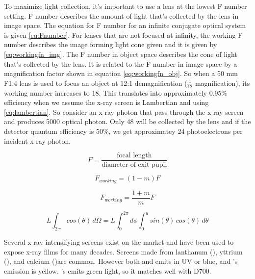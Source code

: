 To maximize light collection, it's important to use a lens at the lowest F number setting.  F number describes the amount of light that's collected by the lens in image space.  The equation for F number for an infinite conjugate optical system is given \ref{eq:Fnumber}.  For lenses that are not focused at infinity, the working F number describes the image forming light cone given and it is given by \ref{eq:workingfn_img}.  The F number in object space describes the cone of light that's collected by the lens.  It is related to the F number in image space by a magnification factor shown in equation \ref{eq:workingfn_obj}.  So when a 50 mm F1.4 lens is used to focus an object at 12:1 demagnification ($\frac{1}{12}$ magnification), its working number increases to 18.  This translates into approximately 0.95\% efficiency when we assume the x-ray screen is Lambertian and using \eqref{eq:lambertian}.  So consider an x-ray photon that pass through the x-ray screen and produces 5000 optical photon.  Only 48 will be collected by the lens and if the detector quantum efficiency is 50\%, we get approximatey 24 photoelectrons per incident x-ray photon.


\begin{equation}\label{eq:Fnumber}
F = \frac{\mbox{focal length}}{\mbox{diameter of exit pupil}}
\end{equation}
	
\begin{equation}\label{eq:workingfn_img}
F_{working} = (1 - m)F
\end{equation}
	
\begin{equation}\label{eq:workingfn_obj}
F_{working} = \frac{1+m}{m}F
\end{equation}
	
\begin{equation}\label{eq:lambertian}
L\int_{2\,\pi} cos( \theta)\, d\Omega = L\int_{0}^{2\pi}d\phi \int_{0}^{u} sin(\theta) \, cos(\theta)\, d\theta
\end{equation}
	
Several x-ray intensifying screens exist on the market and have been used to expose x-ray films for many decades.  Screens made from lanthanum (), yttrium (), and calcium ()are common.  However both  and  emits in UV or blue, and 's emission is yellow.  's emits green light, so it matches well with D700.

